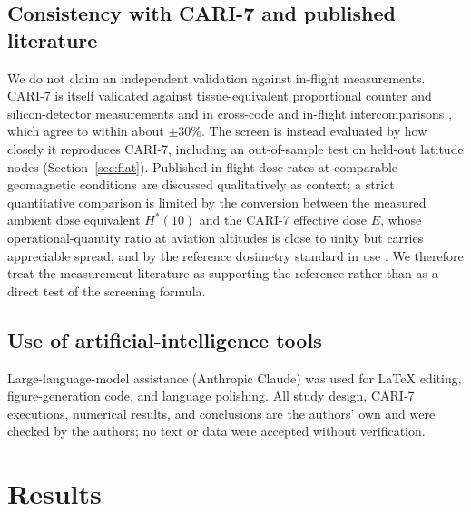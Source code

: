\documentclass[11pt,a4paper]{article}
\begin{document}
\subsection{Consistency with CARI-7 and published literature}
\label{sec:consistency}
We do not claim an independent validation against in-flight measurements.
CARI-7 is itself validated against tissue-equivalent proportional counter
and silicon-detector measurements
\citep{badhwar2002,dachev2010,bennett2013,waker2019,dyer2007} and in
cross-code and in-flight intercomparisons
\citep{eurados2012,bottollier2004,deangelis2009,matthia2014pandoca,meier2018},
which agree to within about $\pm30\%$. The screen is instead
evaluated by how closely it reproduces CARI-7, including an out-of-sample
test on held-out latitude nodes (Section~\ref{sec:flat}). Published
in-flight dose rates at comparable geomagnetic conditions
\citep{lee2015cosmic,spurny2001,matthia2014pandoca} are discussed
qualitatively as context; a strict quantitative comparison is limited by
the conversion between the measured ambient dose equivalent $H^*(10)$ and
the CARI-7 effective dose $E$, whose operational-quantity ratio at aviation
altitudes is close to unity but carries appreciable spread, and by the
reference dosimetry standard in use \citep{icru84,iso207851}. We therefore
treat the measurement literature as supporting the reference rather than as
a direct test of the screening formula.

\subsection{Use of artificial-intelligence tools}
Large-language-model assistance (Anthropic Claude) was used for LaTeX
editing, figure-generation code, and language polishing. All study design,
CARI-7 executions, numerical results, and conclusions are the authors' own
and were checked by the authors; no text or data were accepted without
verification.

\section{Results}
\end{document}
